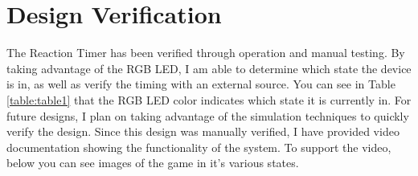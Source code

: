 \documentclass{article}
\begin{document}
\newpage
\section{Design Verification}
The Reaction Timer has been verified through operation and manual testing. By taking advantage of the RGB LED, I am able to determine which state the device is in, as well as verify the timing with an external source. You can see in Table \ref{table:table1} that the RGB LED color indicates which state it is currently in. For future designs, I plan on taking advantage of the simulation techniques to quickly verify the design. Since this design was manually verified, I have provided video documentation showing the functionality of the system. To support the video, below you can see images of the game in it's various states.
\end{document}
